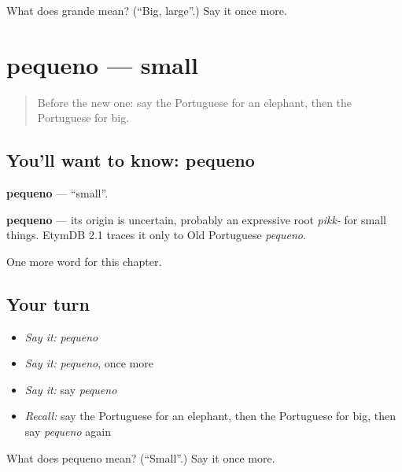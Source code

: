 \begin{tcolorbox}[breakable,colback=teal!4,colframe=teal!35!black,title={Before you move on}]
What does grande mean? (\textquotedblleft{}Big, large\textquotedblright{}.) Say it once more.
\end{tcolorbox}
\section[pequeno]{pequeno — small}

\label{lesson:PT-C64-pequeno}



\begin{quote}
Before the new one: say the Portuguese for an elephant, then the Portuguese for big.
\end{quote}

\subsection*{You'll want to know: pequeno}
\textbf{pequeno} — \textquotedblleft{}small\textquotedblright{}.

\begin{cousinweb}
\textbf{pequeno} — its origin is uncertain, probably an expressive root \emph{pikk-} for small things. EtymDB 2.1 traces it only to Old Portuguese \emph{pequeno}.
\end{cousinweb}

\begin{grammarlens}[title={What you've built}]
One more word for this chapter.
\end{grammarlens}

\subsection*{Your turn}
\begin{itemize}
\raggedright
  \item \emph{Say it:} \emph{pequeno}
  \item \emph{Say it:} \emph{pequeno}, once more
  \item \emph{Say it:} say \emph{pequeno}
  \item \emph{Recall:} say the Portuguese for an elephant, then the Portuguese for big, then say \emph{pequeno} again
\end{itemize}

\begin{tcolorbox}[breakable,colback=teal!4,colframe=teal!35!black,title={Before you move on}]
What does pequeno mean? (\textquotedblleft{}Small\textquotedblright{}.) Say it once more.
\end{tcolorbox}
